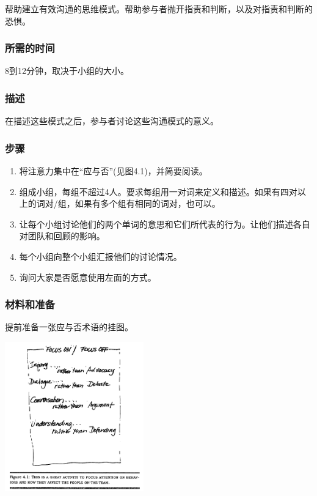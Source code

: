 帮助建立有效沟通的思维模式。帮助参与者抛开指责和判断，以及对指责和判断的恐惧。

\hypertarget{ux6240ux9700ux7684ux65f6ux95f4}{%
\subsubsection{所需的时间}\label{ux6240ux9700ux7684ux65f6ux95f4}}

8到12分钟，取决于小组的大小。

\hypertarget{ux63cfux8ff0}{%
\subsubsection{描述}\label{ux63cfux8ff0}}

在描述这些模式之后，参与者讨论这些沟通模式的意义。

\hypertarget{ux6b65ux9aa4}{%
\subsubsection{步骤}\label{ux6b65ux9aa4}}

\begin{enumerate}
\tightlist
\item
  将注意力集中在``应与否''(见图4.1)，并简要阅读。
\item
  组成小组，每组不超过4人。要求每组用一对词来定义和描述。如果有四对以上的词对/组，如果有多个组有相同的词对，也可以。
\item
  让每个小组讨论他们的两个单词的意思和它们所代表的行为。让他们描述各自对团队和回顾的影响。
\item
  每个小组向整个小组汇报他们的讨论情况。
\item
  询问大家是否愿意使用左面的方式。
\end{enumerate}

\hypertarget{ux6750ux6599ux548cux51c6ux5907}{%
\subsubsection{材料和准备}\label{ux6750ux6599ux548cux51c6ux5907}}

提前准备一张应与否术语的挂图。


\includegraphics[width=6cm]{derby_41.png}


